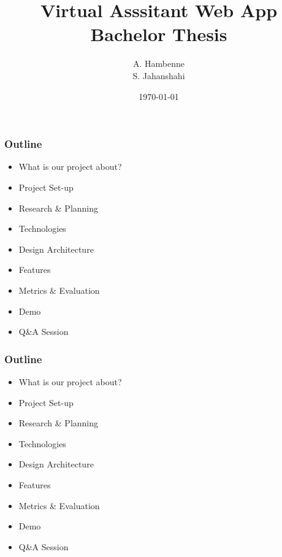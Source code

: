 \documentclass{beamer}
\title[BEP]{Virtual Asssitant Web App\\ \small{Bachelor Thesis}}
\institute[TU Delft]{Delft University of Technology}
\author{A. Hambenne\\
S. Jahanshahi}
\date{\today}
\begin{document}
{
%
\frame{\titlepage}
}

{
}



\begin{frame}\frametitle{Outline}
	\begin{itemize}
		\item What is our project about?
		\item Project Set-up
		\item Research \& Planning
		\item Technologies
		\item Design Architecture
		\item Features
		\item Metrics  \& Evaluation
		\item Demo
		\item Q\&A Session
	\end{itemize}
\end{frame}

\begin{frame}\frametitle{Outline}
	\begin{itemize}
		\item What is our project about?
		\item Project Set-up
		\item Research \& Planning
		\item Technologies
		\item Design Architecture
		\item Features
		\item Metrics  \& Evaluation
		\item Demo
		\item Q\&A Session
	\end{itemize}
\end{frame}
\end{document}
